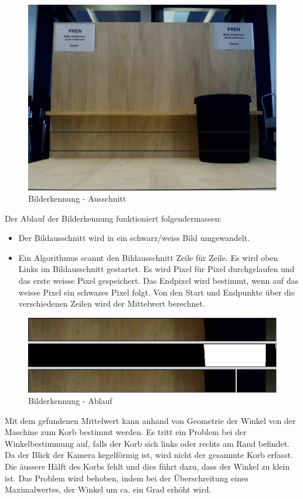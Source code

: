 \begin{figure}[h!]          
	\centering             
	\includegraphics[width=1\textwidth]{fig/BildMitKorb_markiert.png}
	\caption{Bilderkennung - Ausschnitt}
	\label{fig:Bilderkennung_ausschnitt}        
\end{figure}

Der Ablauf der Bilderkennung funktioniert folgendermassen:
\begin{itemize}
	\item Der Bildausschnitt wird in ein schwarz/weiss Bild umgewandelt.
	\item Ein Algorithmus scannt den Bildausschnitt Zeile für Zeile.
	\subitem Es wird oben Links im Bildausschnitt gestartet.
	\subitem Es wird Pixel für Pixel durchgelaufen und das erste weisse Pixel gespeichert.
	\subitem Das Endpixel wird bestimmt, wenn auf das weisse Pixel ein schwazes Pixel folgt.
	\subitem Von den Start und Endpunkte über die verschiedenen Zeilen wird der Mittelwert berechnet.
\end{itemize}

\begin{figure}[h!]          
	\centering             
	\includegraphics[width=1\textwidth]{fig/Korberkennung_Schritte.png}
	\caption{Bilderkennung - Ablauf}
	\label{fig:Bilderkennung_ablauf}        
\end{figure}

Mit dem gefundenen Mittelwert kann anhand von Geometrie der Winkel von der Maschine zum Korb bestimmt werden.
Es tritt ein Problem bei der Winkelbestimmung auf, falls der Korb sich links oder rechts am Rand befindet.
Da der Blick der Kamera kegelförmig ist, wird nicht der gesammte Korb erfasst. Die äussere Hälft des Korbs fehlt
und dies führt dazu, dass der Winkel zu klein ist. Das Problem wird behoben, indem bei der Überschreitung eines
Maximalwertes, der Winkel um ca. ein Grad erhöht wird.
